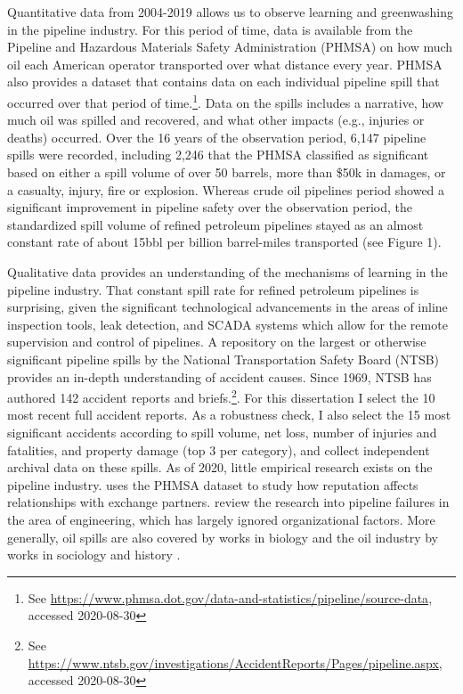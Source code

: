 Quantitative data from 2004-2019 allows us to observe learning and greenwashing in the pipeline industry. For this period of time, data is available from the Pipeline and Hazardous Materials Safety Administration (PHMSA) on how much oil each American operator transported over what distance every year. PHMSA also provides a dataset that contains data on each individual pipeline spill that occurred over that period of time.\footnote{See \url{https://www.phmsa.dot.gov/data-and-statistics/pipeline/source-data}, accessed 2020-08-30}. Data on the spills includes a narrative, how much oil was spilled and recovered, and what other impacts (e.g., injuries or deaths) occurred. Over the 16 years of the observation period, 6,147 pipeline spills were recorded, including 2,246 that the PHMSA classified as significant based on either a spill volume of over 50 barrels, more than \$50k in damages, or a casualty, injury, fire or explosion. Whereas crude oil pipelines period showed a significant improvement in pipeline safety over the observation period, the standardized spill volume of refined petroleum pipelines stayed as an almost constant rate of about 15bbl per billion barrel-miles transported (see Figure 1). 

Qualitative data provides an understanding of the mechanisms of learning in the pipeline industry. That constant spill rate for refined petroleum pipelines is surprising, given the significant technological advancements in the areas of inline inspection tools, leak detection, and SCADA systems which allow for the remote supervision and control of pipelines. A repository on the largest or otherwise significant pipeline spills by the National Transportation Safety Board (NTSB) provides an in-depth understanding of accident causes. Since 1969, NTSB has authored 142 accident reports and briefs.\footnote{See \url{https://www.ntsb.gov/investigations/AccidentReports/Pages/pipeline.aspx}, accessed 2020-08-30}. For this dissertation I select the 10 most recent full accident reports. As a robustness check, I also select the 15 most significant accidents according to spill volume, net loss, number of injuries and fatalities, and property damage (top 3 per category), and collect independent archival data on these spills. As of 2020, little empirical research exists on the pipeline industry. \citet{Park2019} uses the PHMSA dataset to study how reputation affects relationships with exchange partners. \citet{Zakikhani2020} review the research into pipeline failures in the area of engineering, which has largely ignored organizational factors. More generally, oil spills are also covered by works in biology \citep[in particular][]{Burger1997} and the oil industry by works in sociology and history \citep[e.g.,][]{Dochuk2019}.

